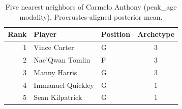 \begin{table}[htbp]
  \centering\small
  \begin{tabular}{rllc}
    \toprule
    Rank & Player & Position & Archetype \\
    \midrule
    1 & Vince Carter & G & 3 \\
    2 & Nae'Qwan Tomlin & F & 3 \\
    3 & Manny Harris & G & 3 \\
    4 & Immanuel Quickley & G & 1 \\
    5 & Sean Kilpatrick & G & 1 \\
    \bottomrule
  \end{tabular}
  \caption{Five nearest neighbors of Carmelo Anthony (peak_age modality), Procrustes-aligned posterior mean.}
  \label{tab:Carmelo_Anthony_neighbors_peak_age}
\end{table}

